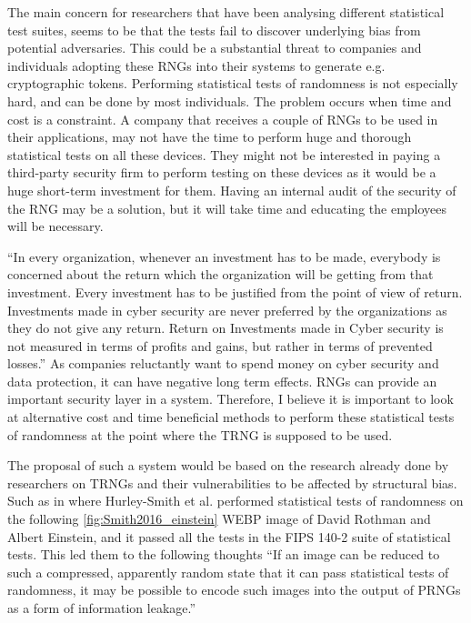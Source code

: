 \documentclass[]{final_report}
\begin{document}
\par{The main concern for researchers that have been analysing different statistical test suites, seems to be that the tests fail to discover underlying bias from potential adversaries. This could be a substantial threat to companies and individuals adopting these RNGs into their systems to generate e.g. cryptographic tokens. Performing statistical tests of randomness is not especially hard, and can be done by most individuals. The problem occurs when time and cost is a constraint. A company that receives a couple of RNGs to be used in their applications, may not have the time to perform huge and thorough statistical tests on all these devices. They might not be interested in paying a third-party security firm to perform testing on these devices as it would be a huge short-term investment for them. Having an internal audit of the security of the RNG may be a solution, but it will take time and educating the employees will be necessary.}

\par{``In every organization, whenever an investment has to be made, everybody is concerned about the return which the organization will be getting from that investment. Every investment has to be justified from the point of view of return. Investments made in cyber security are never preferred by the organizations as they do not give any return. Return on Investments made in Cyber security is not measured in terms of profits and gains, but rather in terms of prevented losses.''\cite{Kesswani:2015} As companies reluctantly want to spend money on cyber security and data protection, it can have negative long term effects. RNGs can provide an important security layer in a system. Therefore, I believe it is important to look at alternative cost and time beneficial methods to perform these statistical tests of randomness at the point where the TRNG is supposed to be used.}

\par{The proposal of such a system would be based on the research already done by researchers on TRNGs and their vulnerabilities to be affected by structural bias. Such as in \cite{Smith:2020} where Hurley-Smith et al. performed statistical tests of randomness on the following \ref{fig:Smith2016_einstein} WEBP image of David Rothman and Albert Einstein, and it passed all the tests in the FIPS 140-2 suite of statistical tests. This led them to the following thoughts ``If an image can be reduced to such a compressed, apparently random state that it can pass statistical tests of randomness, it may be possible to encode such images into the output of PRNGs as a form of information leakage.''\cite{Smith:2020}}
\end{document}

